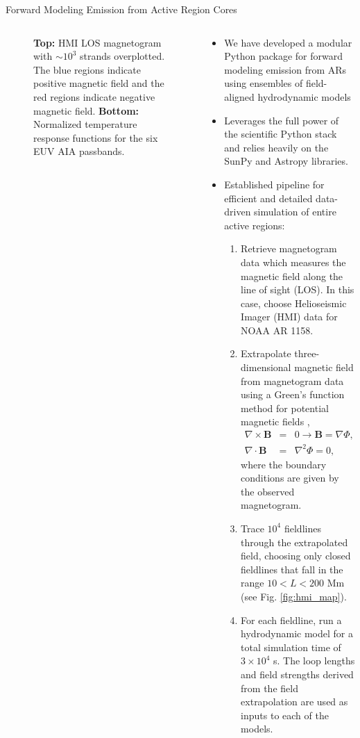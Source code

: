 \documentclass[final]{beamer}
\begin{document}
\begin{frame}
\begin{columns}[T]
\begin{column}{0.49\linewidth}
\begin{block}{Forward Modeling Emission from Active Region Cores}
\begin{columns}[T]
\begin{column}{0.49\columnwidth}
\begin{figure}
{                \label{fig:response_functions}}
                \caption{\textbf{Top:} HMI LOS magnetogram with $\sim10^3$ strands overplotted. The blue regions indicate positive magnetic field and the red regions indicate negative magnetic field. \textbf{Bottom:} Normalized temperature response functions for the six EUV AIA passbands.}
            \end{figure}
        \end{column}
        \begin{column}{0.49\columnwidth}
            \begin{itemize}
                \item We have developed a modular Python package for forward modeling emission from ARs using ensembles of field-aligned hydrodynamic models
                \item Leverages the full power of the scientific Python stack and relies heavily on the SunPy \citep{sunpy_community_sunpypython_2015} and Astropy \citep{astropy_collaboration_astropy:_2013} libraries.
                \item Established pipeline for efficient and detailed data-driven simulation of \alert{entire active regions}:
                \begin{enumerate}
                    \item Retrieve magnetogram data which measures the magnetic field along the line of sight (LOS). In this case, choose Helioseismic Imager (HMI) data for NOAA AR 1158.
                    \item Extrapolate three-dimensional magnetic field from magnetogram data using a Green's function method for potential magnetic fields \citep{sakurai_greens_1982},
                    \begin{eqnarray*}
                        \nabla\times\mathbf{B} &=& 0 \rightarrow \mathbf{B} = \nabla\Phi, \\
                        \nabla\cdot\mathbf{B} &=& \nabla^2\Phi = 0,
                    \end{eqnarray*}
                    where the boundary conditions are given by the observed magnetogram.
                    \item Trace $10^4$ fieldlines through the extrapolated field, choosing only \alert{closed} fieldlines that fall in the range $10<L<200$ Mm (see Fig. \ref{fig:hmi_map}).
                    \item For each fieldline, run a hydrodynamic model for a total simulation time of $3\times10^4$ s. The loop lengths and field strengths derived from the field extrapolation are used as inputs to each of the models.

\end{enumerate}
\end{itemize}
\end{column}
\end{columns}
\end{block}
\end{column}
\end{columns}
\end{frame}
\end{document}
